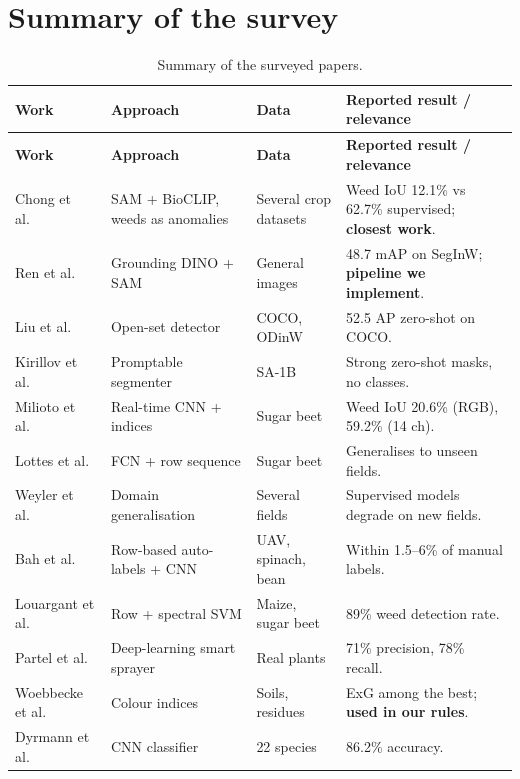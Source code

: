 \section{Summary of the survey}
\begin{small}
\begin{longtable}{@{}L{2.5cm}L{3.4cm}L{3.4cm}L{4.6cm}@{}}
\caption{Summary of the surveyed papers.}\label{tab:survey}\\
\toprule
\textbf{Work} & \textbf{Approach} & \textbf{Data} & \textbf{Reported result / relevance}\\
\midrule\endfirsthead
\toprule
\textbf{Work} & \textbf{Approach} & \textbf{Data} & \textbf{Reported result / relevance}\\
\midrule\endhead
Chong et al.~\cite{chong2025zeroshot} & SAM + BioCLIP, weeds as anomalies & Several crop datasets & Weed IoU 12.1\% vs 62.7\% supervised; \textbf{closest work}.\\
Ren et al.~\cite{ren2024groundedsam} & Grounding DINO + SAM & General images & 48.7 mAP on SegInW; \textbf{pipeline we implement}.\\
Liu et al.~\cite{liu2024groundingdino} & Open-set detector & COCO, ODinW & 52.5 AP zero-shot on COCO.\\
Kirillov et al.~\cite{kirillov2023sam} & Promptable segmenter & SA-1B & Strong zero-shot masks, no classes.\\
Milioto et al.~\cite{milioto2018realtime} & Real-time CNN + indices & Sugar beet & Weed IoU 20.6\% (RGB), 59.2\% (14 ch).\\
Lottes et al.~\cite{lottes2018fcn} & FCN + row sequence & Sugar beet & Generalises to unseen fields.\\
Weyler et al.~\cite{weyler2023domain} & Domain generalisation & Several fields & Supervised models degrade on new fields.\\
Bah et al.~\cite{bah2018unsupervised} & Row-based auto-labels + CNN & UAV, spinach, bean & Within 1.5--6\% of manual labels.\\
Louargant et al.~\cite{louargant2018rowcrops} & Row + spectral SVM & Maize, sugar beet & 89\% weed detection rate.\\
Partel et al.~\cite{partel2019sprayer} & Deep-learning smart sprayer & Real plants & 71\% precision, 78\% recall.\\
Woebbecke et al.~\cite{woebbecke1995color} & Colour indices & Soils, residues & ExG among the best; \textbf{used in our rules}.\\
Dyrmann et al.~\cite{dyrmann2016species} & CNN classifier & 22 species & 86.2\% accuracy.\\

\end{longtable}
\end{small}

